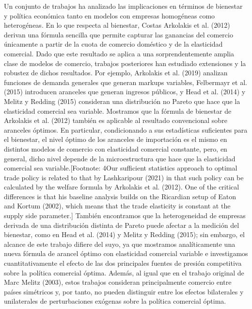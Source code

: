 \documentclass[10pt,a4paper]{article}
\begin{document}
Un conjunto de trabajos ha analizado las implicaciones en términos de bienestar y política económica tanto en modelos con empresas homogéneas como heterogéneas. En lo que respecta al bienestar, Costas Arkolakis et al. (2012) derivan una fórmula sencilla que permite capturar las ganancias del comercio únicamente a partir de la cuota de comercio doméstico y de la elasticidad comercial. Dado que este resultado se aplica a una sorprendentemente amplia clase de modelos de comercio, trabajos posteriores han estudiado extensiones y la robustez de dichos resultados. Por ejemplo, Arkolakis et al. (2019) analizan funciones de demanda generales que generan markups variables, Felbermayr et al. (2015) introducen aranceles que generan ingresos públicos, y Head et al. (2014) y Melitz y Redding (2015) consideran una distribución no Pareto que hace que la elasticidad comercial sea variable. Mostramos que la fórmula de bienestar de Arkolakis et al. (2012) también es aplicable al resultado convencional sobre aranceles óptimos. En particular, condicionando a sus estadísticas suficientes para el bienestar, el nivel óptimo de los aranceles de importación es el mismo en distintos modelos de comercio con elasticidad comercial constante, pero, en general, dicho nivel depende de la microestructura que hace que la elasticidad comercial sea variable.[Footnote: 4Our sufficient statistics approach to optimal trade policy is related to that by Lashkaripour (2021) in that such policy can be calculated by the welfare formula by Arkolakis et al. (2012). One of the critical differences is that his baseline analysis builds on the Ricardian setup of Eaton and Kortum (2002), which means that the trade elasticity is constant at the supply side parameter.] También encontramos que la heterogeneidad de empresas derivada de una distribución distinta de Pareto puede afectar a la medición del bienestar, como en Head et al. (2014) y Melitz y Redding (2015); sin embargo, el alcance de este trabajo difiere del suyo, ya que mostramos analíticamente una nueva fórmula de arancel óptimo con elasticidad comercial variable e investigamos cuantitativamente el efecto de las dos principales fuentes de presión competitiva sobre la política comercial óptima. Además, al igual que en el trabajo original de Marc Melitz (2003), estos trabajos consideran principalmente comercio entre países simétricos y, por tanto, no pueden distinguir entre los efectos bilaterales y unilaterales de perturbaciones exógenas sobre la política comercial óptima.
\end{document}
